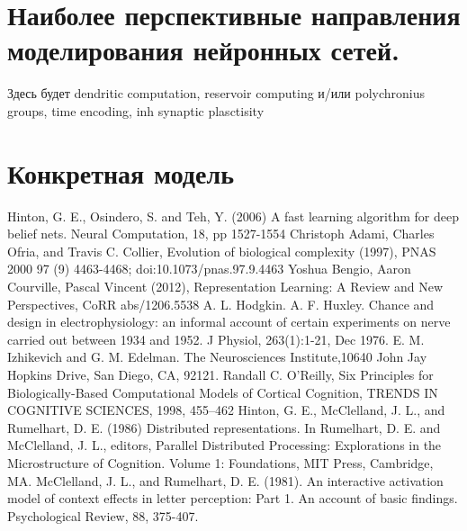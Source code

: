 \documentclass[a4paper,10pt]{article}
\begin{document}
\begin{enumerate}
\section*{Наиболее перспективные направления моделирования нейронных сетей.}
Здесь будет dendritic computation, reservoir computing и/или polychronius groups, time encoding, inh synaptic plasctisity 

\section*{Конкретная модель}
\end{enumerate}

\newpage
\begin{thebibliography}{9}
Hinton, G. E., Osindero, S. and Teh, Y. (2006)
A fast learning algorithm for deep belief nets.
Neural Computation, 18, pp 1527-1554
Christoph Adami, Charles Ofria, and Travis C. Collier, Evolution of biological complexity (1997), PNAS 2000 97 (9) 4463-4468; doi:10.1073/pnas.97.9.4463
Yoshua Bengio, Aaron Courville, Pascal Vincent (2012), Representation Learning: A Review and New Perspectives, CoRR abs/1206.5538 
A. L. Hodgkin. A. F. Huxley. Chance and design in electrophysiology: an informal account of certain experiments on nerve carried out between 1934 and 1952. J Physiol, 263(1):1-21, Dec 1976.
E. M. Izhikevich and G. M. Edelman. The Neurosciences Institute,10640 John Jay Hopkins Drive, San Diego, CA, 92121.
Randall C. O'Reilly, Six Principles for Biologically-Based Computational Models of Cortical Cognition, TRENDS IN COGNITIVE SCIENCES, 1998, 455--462
Hinton, G. E., McClelland, J. L., and Rumelhart, D. E. (1986)
Distributed representations. 
In Rumelhart, D. E. and McClelland, J. L., editors, Parallel Distributed Processing: Explorations in the Microstructure of Cognition. Volume 1: Foundations, MIT Press, Cambridge, MA.
McClelland, J. L., and Rumelhart, D. E. (1981). An interactive activation model of context effects in letter perception: Part 1. An account of basic findings. Psychological Review, 88, 375-407.
\end{thebibliography}
\end{document}
